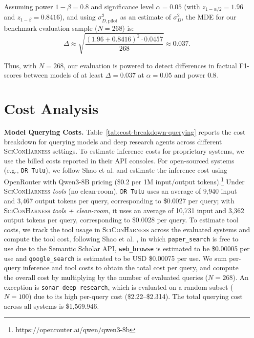 \documentclass{article}
\newcommand{\xhdr}[1]{%
  \noindent\textbf{#1.}
}
\begin{document}
Assuming power $1-\beta = 0.8$ and significance level $\alpha = 0.05$ (with $z_{1-\alpha/2} = 1.96$ and $z_{1-\beta} = 0.8416$), and using $\sigma_{D,\text{pilot}}^2$ as an estimate of $\sigma_D^2$, the MDE for our benchmark evaluation sample ($N=268$) is:
\[
\Delta \approx \sqrt{\frac{(1.96 + 0.8416)^2 \cdot 0.0457}{268}} \approx 0.037.
\]

Thus, with $N=268$, our evaluation is powered to detect differences in factual F1-scores between models of at least $\Delta = 0.037$ at $\alpha=0.05$ and power $0.8$.


\newpage 

\section{Cost Analysis}\label{appendix:cost-analysis}

\xhdr{Model Querying Costs} Table~\ref{tab:cost-breakdown-querying} reports the cost breakdown for querying models and deep research agents across different \textsc{SciConHarness} settings. To estimate inference costs for proprietary systems, we use the billed costs reported in their API consoles. For open-sourced systems (e.g., \texttt{DR Tulu}), we follow Shao et al. \cite{shao2025drtulureinforcementlearning} and estimate the inference cost using OpenRouter with Qwen3-8B pricing (\$0.2 per 1M input/output tokens).\footnote{https://openrouter.ai/qwen/qwen3-8b} Under \textsc{SciConHarness} \textit{tools} (no clean-room), \texttt{DR Tulu} uses an average of 9{,}940 input and 3{,}467 output tokens per query, corresponding to \$0.0027 per query; with \textsc{SciConHarness} \textit{tools + clean-room}, it uses an average of 10{,}731 input and 3{,}362 output tokens per query, corresponding to \$0.0028 per query. To estimate tool costs, we track the tool usage in \textsc{SciConHarness} across the evaluated systems and compute the tool cost, following Shao et al. \cite{shao2025drtulureinforcementlearning}, in which \texttt{paper\_search} is free to use due to the Semantic Scholar API, \texttt{web\_browse} is estimated to be \$0.00005 per use and \texttt{google\_search} is estimated to be USD \$0.00075 per use. We sum per-query inference and tool costs to obtain the total cost per query, and compute the overall cost by multiplying by the number of evaluated queries ($N=268$). An exception is \texttt{sonar-deep-research}, which is evaluated on a random subset ($N=100$) due to its high per-query cost (\$2.22--\$2.314). The total querying cost across all systems is \$1,569.946.
\end{document}
